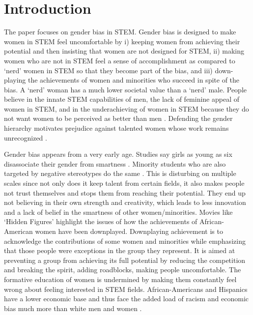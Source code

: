 \documentclass[utf8]{frontiersSCNS} %
\begin{document}
\section{Introduction}
The paper focuses on gender bias in STEM. Gender bias is designed to make women in STEM feel uncomfortable by i) keeping women from achieving their potential and then insisting that women are not designed for STEM, ii) making women who are not in STEM feel a sense of accomplishment as compared to `nerd’ women in STEM so that they become part of the bias, and iii) down-playing the achievements of women and minorities who succeed in spite of the bias. A `nerd’ woman has a much lower societal value than a `nerd’ male. People believe in the innate STEM capabilities of men, the lack of feminine appeal of women in STEM, and in the underachieving of women in STEM because they do not want women to be perceived as better than men \citep{rudman2012status}.   Defending the gender hierarchy motivates prejudice against talented women whose work remains unrecognized \citep{rudman2012status}. 

Gender bias appears from a very early age. Studies say girls as young as six disassociate their gender from smartness \citep{bian2018messages}. Minority students who are also targeted by negative stereotypes do the same \citep{fine1984racial}. This is disturbing on multiple scales since not only does it keep talent from certain fields, it also makes people not trust themselves and stops them from reaching their potential. They end up not believing in their own strength and creativity, which leads to less innovation and a lack of belief in the smartness of other women/minorities. Movies like ‘Hidden Figures’ highlight the issues of how the achievements of African-American women have been downplayed. Downplaying achievement is to acknowledge the contributions of some women and minorities while emphasizing that those people were exceptions in the group they represent. It is aimed at preventing a group from achieving its full potential by reducing the competition and breaking the spirit, adding roadblocks, making people uncomfortable. The formative education of women is undermined by making them constantly feel wrong about feeling interested in STEM fields. African-Americans and Hispanics have a lower economic base and thus face the added load of racism and economic bias much more than white men and women \citep{BlackEco2,BlackEco1}.
\end{document}
